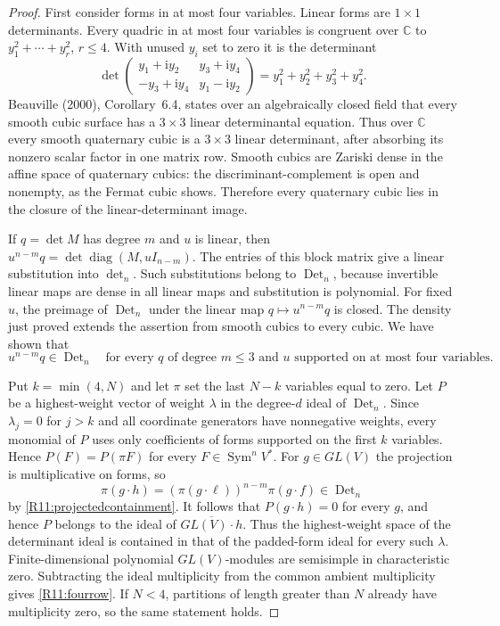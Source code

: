 \documentclass[11pt,a4paper]{article}
\theoremstyle{definition}\newtheorem{definition}{Definition}
\begin{document}
\begin{proof}
First consider forms in at most four variables. Linear forms are
$1\times1$ determinants. Every quadric in at most four variables
is congruent over $\mathbb C$ to $y_1^2+\cdots+y_r^2$, $r\leq4$.
With unused $y_i$ set to zero it is the determinant
\begin{equation}\label{R11:quadric}
 \det\begin{pmatrix}
 y_1+\mathrm i y_2&y_3+\mathrm i y_4\\
 -y_3+\mathrm i y_4&y_1-\mathrm i y_2
 \end{pmatrix}=
 y_1^2+y_2^2+y_3^2+y_4^2.
\end{equation}
Beauville (2000), Corollary~6.4, states over an algebraically
closed field that every smooth cubic surface has a $3\times3$
linear determinantal equation. Thus over $\mathbb C$ every smooth
quaternary cubic is a $3\times3$ linear determinant, after
absorbing its nonzero scalar factor in one matrix row.
Smooth cubics are Zariski dense in the affine space of quaternary
cubics: the discriminant-complement is open and nonempty, as the
Fermat cubic shows. Therefore every quaternary cubic lies in the
closure of the linear-determinant image.

If $q=\det M$ has degree $m$ and $u$ is linear, then
$u^{n-m}q=\det\operatorname{diag}(M,uI_{n-m})$.
The entries of this block matrix give a linear substitution into
$\det_n$. Such substitutions belong to $\operatorname{Det}_n$,
because invertible linear maps are dense in all linear maps and
substitution is polynomial. For fixed $u$, the preimage of
$\operatorname{Det}_n$ under the linear map $q\mapsto u^{n-m}q$
is closed. The density just proved extends the assertion from
smooth cubics to every cubic. We have shown that
\begin{equation}\label{R11:projectedcontainment}
 u^{n-m}q\in\operatorname{Det}_n
 \quad\text{for every }q\text{ of degree }m\leq3
 \text{ and }u\text{ supported on at most four variables}.
\end{equation}

Put $k=\min(4,N)$ and let $\pi$ set the last $N-k$ variables
equal to zero. Let $P$ be a highest-weight vector of weight
$\lambda$ in the degree-$d$ ideal of $\operatorname{Det}_n$.
Since $\lambda_j=0$ for $j>k$ and all coordinate generators have
nonnegative weights, every monomial of $P$ uses only coefficients
of forms supported on the first $k$ variables. Hence
$P(F)=P(\pi F)$ for every $F\in\operatorname{Sym}^nV^*$.
For $g\in GL(V)$ the projection is multiplicative on forms, so
\[
 \pi(g\cdot h)=(\pi(g\cdot\ell))^{n-m}\pi(g\cdot f)
 \in\operatorname{Det}_n
\]
by \eqref{R11:projectedcontainment}. It follows that
$P(g\cdot h)=0$ for every $g$, and hence $P$ belongs to the
ideal of $\overline{GL(V)\cdot h}$.
Thus the highest-weight space of the determinant ideal is
contained in that of the padded-form ideal for every such
$\lambda$. Finite-dimensional polynomial $GL(V)$-modules are
semisimple in characteristic zero. Subtracting the ideal
multiplicity from the common ambient multiplicity gives
\eqref{R11:fourrow}. If $N<4$, partitions of length greater than
$N$ already have multiplicity zero, so the same statement holds.
\end{proof}
\end{document}
